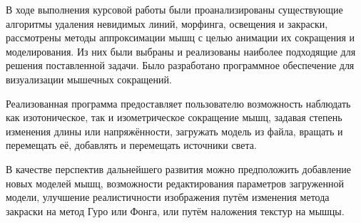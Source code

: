 \Conclusion %
В ходе выполнения курсовой работы были проанализированы существующие алгоритмы удаления невидимых линий, морфинга, освещения и закраски, рассмотрены методы аппроксимации мышц с целью анимации их сокращения и моделирования. Из них были выбраны и реализованы наиболее подходящие для решения поставленной задачи. Было разработано программное обеспечение для визуализации мышечных сокращений.
\par Реализованная программа предоставляет пользователю возможность наблюдать как изотоническое, так и изометрическое сокращение мышц, задавая степень изменения длины или напряжённости, загружать модель из файла, вращать и перемещать её, добавлять и перемещать источники света.
\par В качестве перспектив дальнейшего развития можно предположить добавление новых моделей мышц, возможности редактирования параметров загруженной модели, улучшение реалистичности изображения путём изменения метода закраски на метод Гуро или Фонга, или путём наложения текстур на мышцы.
